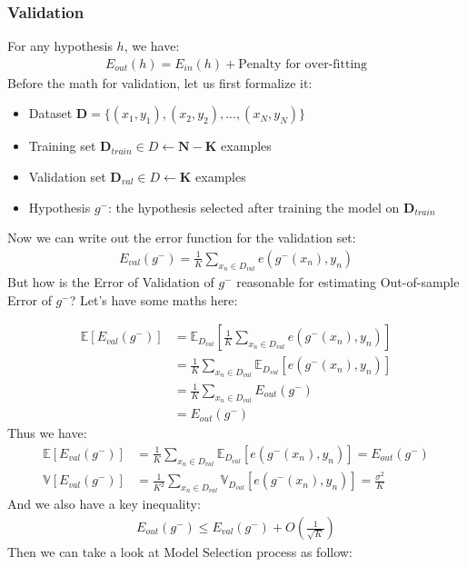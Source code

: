 \documentclass{article}
\begin{document}
\subsubsection{Validation}
For any hypothesis $h$, we have:
\begin{align*}
    E_{out}(h) = E_{in}(h) + \text{Penalty for over-fitting}
\end{align*}
Before the math for validation, let us first formalize it:
\begin{itemize}
    \item Dataset $\bm{D} = \{(x_1, y_1), (x_2, y_2), ..., (x_N, y_N) \}$
    \item Training set $\bm{D}_{train} \in D \leftarrow \bm{N} - \bm{K}$ examples
    \item Validation set $\bm{D}_{val} \in D \leftarrow \bm{K}$ examples
    \item Hypothesis $g^{-}$: the hypothesis selected after training the model on $\bm{D}_{train}$
\end{itemize}
Now we can write out the error function for the validation set:
\begin{align*}
    E_{val}(g^{-}) = \frac{1}{K} \sum_{x_{n}\in D_{val}} e\left( g^{-}(x_{n}), y_{n} \right) 
\end{align*}
But how is the Error of Validation of $g^-$ reasonable for estimating Out-of-sample Error of $g^-$? Let's have some maths here:

\begin{align*}
    \mathbb{E} \left[ E_{val}(g^{-}) \right]
    &= \mathbb{E}_{D_{val}} \left[ \frac{1}{K}\sum_{x_{n}\in D_{val}} e\left( g^{-}(x_{n}), y_{n} \right) \right]\\
    &= \frac{1}{K} \sum_{x_{n}\in D_{val}} \mathbb{E}_{D_{val}} \left[ e\left( g^{-}(x_{n}), y_{n} \right)\right]\\
    &= \frac{1}{K} \sum_{x_{n}\in D_{val}} E_{out}(g^{-})\\
    &= E_{out}(g^{-})
\end{align*}
Thus we have:
\begin{align*}
    \mathbb{E} \left[ E_{val}(g^{-}) \right]
    &= \frac{1}{K} \sum_{x_{n}\in D_{val}} \mathbb{E}_{D_{val}} \left[ e\left( g^{-}(x_{n}), y_{n} \right)\right]
    =  E_{out}(g^{-})\\
    \mathbb{V} \left[ E_{val}(g^{-}) \right]
    &= \frac{1}{K^{2}} \sum_{x_{n}\in D_{val}} \mathbb{V}_{D_{val}} \left[ e\left( g^{-}(x_{n}), y_{n} \right)\right]
    =  \frac{\sigma^{2}}{K}
\end{align*}
And we also have a key inequality:
\begin{align*}
     E_{out}(g^{-}) \leq  E_{val}(g^{-}) + O\left( \frac{1}{\sqrt{K}} \right)
\end{align*}
Then we can take a look at Model Selection process as follow:
\end{document}
